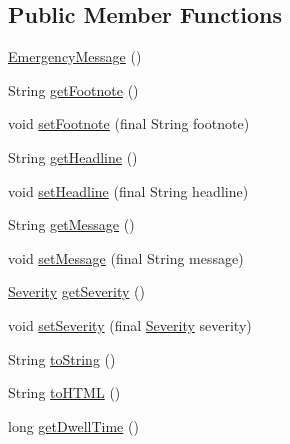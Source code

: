 \subsection*{Public Member Functions}
\begin{DoxyCompactItemize}
\item 
\hyperlink{classgov_1_1fnal_1_1ppd_1_1dd_1_1emergency_1_1EmergencyMessage_a8ff00aea644a3e8430be7b1ebfdcc877}{Emergency\-Message} ()
\item 
String \hyperlink{classgov_1_1fnal_1_1ppd_1_1dd_1_1emergency_1_1EmergencyMessage_acfba258c7a1ca417cd3e2b6a34962307}{get\-Footnote} ()
\item 
void \hyperlink{classgov_1_1fnal_1_1ppd_1_1dd_1_1emergency_1_1EmergencyMessage_a4fe3dd4efe7785fb96a20cc5ec876a14}{set\-Footnote} (final String footnote)
\item 
String \hyperlink{classgov_1_1fnal_1_1ppd_1_1dd_1_1emergency_1_1EmergencyMessage_aac57716c9b712f118b942fd3edf09b2e}{get\-Headline} ()
\item 
void \hyperlink{classgov_1_1fnal_1_1ppd_1_1dd_1_1emergency_1_1EmergencyMessage_aaa15b556a2f1b9bae865230c771bdfca}{set\-Headline} (final String headline)
\item 
String \hyperlink{classgov_1_1fnal_1_1ppd_1_1dd_1_1emergency_1_1EmergencyMessage_ac1a09c2b7982ceee596fe5c7a637cd83}{get\-Message} ()
\item 
void \hyperlink{classgov_1_1fnal_1_1ppd_1_1dd_1_1emergency_1_1EmergencyMessage_a11593c234d3c53ab05709bb39b89393b}{set\-Message} (final String message)
\item 
\hyperlink{enumgov_1_1fnal_1_1ppd_1_1dd_1_1emergency_1_1Severity}{Severity} \hyperlink{classgov_1_1fnal_1_1ppd_1_1dd_1_1emergency_1_1EmergencyMessage_acd066bcf80d0687b20e73b1d6c05956f}{get\-Severity} ()
\item 
void \hyperlink{classgov_1_1fnal_1_1ppd_1_1dd_1_1emergency_1_1EmergencyMessage_ae38b8edb43b3bcfb6994b4d69d51bfb4}{set\-Severity} (final \hyperlink{enumgov_1_1fnal_1_1ppd_1_1dd_1_1emergency_1_1Severity}{Severity} severity)
\item 
String \hyperlink{classgov_1_1fnal_1_1ppd_1_1dd_1_1emergency_1_1EmergencyMessage_ad4a6add7f7749222092846233891b2c3}{to\-String} ()
\item 
String \hyperlink{classgov_1_1fnal_1_1ppd_1_1dd_1_1emergency_1_1EmergencyMessage_a44a12fafc3c58182f0ab1480ed771df6}{to\-H\-T\-M\-L} ()
\item 
long \hyperlink{classgov_1_1fnal_1_1ppd_1_1dd_1_1emergency_1_1EmergencyMessage_a661ef4b26e005fb488403ec6f6806722}{get\-Dwell\-Time} ()

\end{DoxyCompactItemize}
